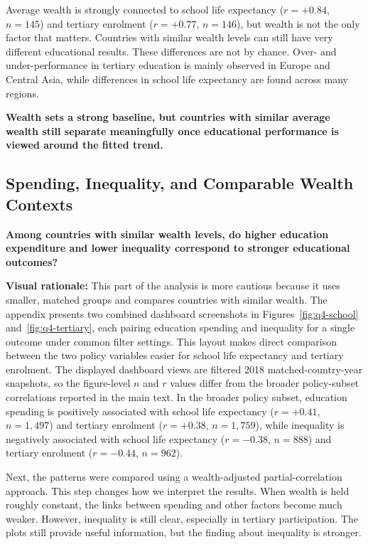 \documentclass{vgtc}
\begin{document}
Average wealth is strongly connected to school life expectancy ($r=+0.84$, $n=145$) and tertiary enrolment ($r=+0.77$, $n=146$), but wealth is not the only factor that matters. Countries with similar wealth levels can still have very different educational results. These differences are not by chance. Over- and under-performance in tertiary education is mainly observed in Europe and Central Asia, while differences in school life expectancy are found across many regions.

\textbf{Wealth sets a strong baseline, but countries with similar average wealth still separate meaningfully once educational performance is viewed around the fitted trend.}

\subsection{Spending, Inequality, and Comparable Wealth Contexts}
\textbf{Among countries with similar wealth levels, do higher education expenditure and lower inequality correspond to stronger educational outcomes?}

\textbf{Visual rationale:} This part of the analysis is more cautious because it uses smaller, matched groups and compares countries with similar wealth. The appendix presents two combined dashboard screenshots in Figures~\ref{fig:q4-school} and~\ref{fig:q4-tertiary}, each pairing education spending and inequality for a single outcome under common filter settings. This layout makes direct comparison between the two policy variables easier for school life expectancy and tertiary enrolment. The displayed dashboard views are filtered 2018 matched-country-year snapshots, so the figure-level $n$ and $r$ values differ from the broader policy-subset correlations reported in the main text. In the broader policy subset, education spending is positively associated with school life expectancy ($r=+0.41$, $n=1{,}497$) and tertiary enrolment ($r=+0.38$, $n=1{,}759$), while inequality is negatively associated with school life expectancy ($r=-0.38$, $n=888$) and tertiary enrolment ($r=-0.44$, $n=962$).

Next, the patterns were compared using a wealth-adjusted partial-correlation approach. This step changes how we interpret the results. When wealth is held roughly constant, the links between spending and other factors become much weaker. However, inequality is still clear, especially in tertiary participation. The plots still provide useful information, but the finding about inequality is stronger.
\end{document}
